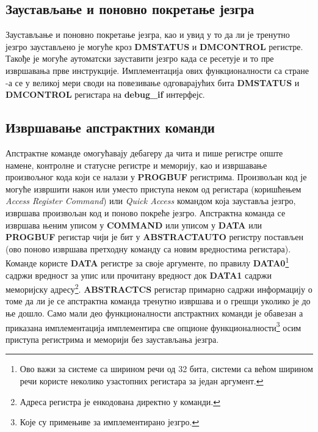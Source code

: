 

\subsection{Заустављање и поновно покретање језгра}

Заустављање и поновно покретање језгра, као и увид у то да ли је тренутно језгро заустављено је могуће кроз \textbf{\acrshort{DMSTATUS}} и \textbf{\acrshort{DMCONTROL}} регистре. Такође је могуће аутоматски зауставити језгро када се ресетује и то пре извршавања прве инструкције. Имплементација ових функционалности са стране -а се у великој мери своди на повезивање одговарајућих бита \textbf{\acrshort{DMSTATUS}} и \textbf{\acrshort{DMCONTROL}} регистара на \textbf{debug\_if} интерфејс.

\subsection{Извршавање апстрактних команди}

Апстрактне команде омогућавају дебагеру да чита и пише регистре опште намене, контролне и статусне регистре и меморију, као и извршавање произвољног кода који се налази у \textbf{\acrshort{PROGBUF}} регистрима. Произвољан код је могуће извршити након или уместо приступа неком од регистара (коришћењем \textit{Access Register Command}) или \textit{Quick Access} командом која зауставља језгро, извршава произвољан код и поново покреће језгро. Апстрактна команда се извршава њеним уписом у \textbf{COMMAND} или уписом у \textbf{DATA} или \textbf{\acrshort{PROGBUF}} регистар чији је бит у \textbf{ABSTRACTAUTO} регистру постављен (ово поново извршава претходну команду са новим вредностима регистара). Команде користе \textbf{DATA} регистре за своје аргументе, по правилу  \textbf{DATA0}\footnote{Ово важи за системе са ширином речи од 32 бита, системи са већом ширином речи користе неколико узастопних регистара за један аргумент.} садржи вредност за упис или прочитану вредност док \textbf{DATA1} садржи меморијску адресу\footnote{Адреса регистра је енкодована директно у команди.}. \textbf{\acrshort{ABSTRACTCS}} регистар примарно садржи информацију о томе да ли је се апстрактна команда тренутно извршава и о грешци уколико је до ње дошло. Само мали део функционалности апстрактних команди је обавезан а приказана имплементација имплементира све опционе функционалности\footnote{Које су примењиве за имплементирано језгро.} осим приступа регистрима и меморији без заустављања језгра.

